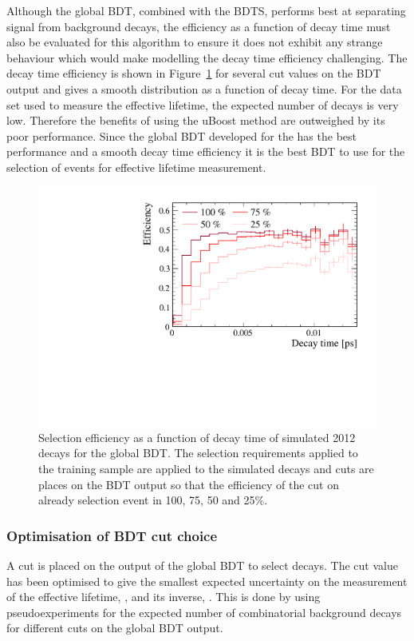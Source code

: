 Although the global BDT, combined with the BDTS, performs best at separating signal from background decays, the efficiency as a function of decay time must also be evaluated for this algorithm to ensure it does not exhibit any strange behaviour which would make modelling the decay time efficiency challenging. The decay time efficiency is shown in Figure~\ref{fig:accptsBFBDTs} for several cut values on the BDT output and gives a smooth distribution as a function of decay time. For the data set used to measure the \bsmumu effective lifetime, the expected number of \bsmumu decays is very low. Therefore the benefits of using the uBoost method are outweighed by its poor performance. Since the global BDT developed for the \BFm has the best performance and a smooth decay time efficiency it is the best BDT to use for the selection of events for effective lifetime measurement. 
\begin{figure}[htbp]
    \centering
        \includegraphics[width=0.6 \textwidth]{./Figs/Selection/BDT1_acceptances.pdf}
    \caption{Selection efficiency as a function of decay time of simulated 2012 \bsmumu decays for the global BDT. The selection requirements applied to the training sample are applied to the simulated decays and cuts are places on the BDT output so that the efficiency of the cut on already selection event in 100, 75, 50 and 25$\%$. }
    \label{fig:accptsBFBDTs}
\end{figure}

\subsubsection{Optimisation of BDT cut choice}
\label{sec:globalBDToptimisation}

A cut is placed on the output of the global BDT to select \bsmumu decays. The cut value has been optimised to give the smallest expected uncertainty on the measurement of the \bsmumu effective lifetime, \tmumu, and its inverse, \invtmumu. This is done by using pseudoexperiments for the expected number of \bsmumu combinatorial background decays for different cuts on the global BDT output. %

